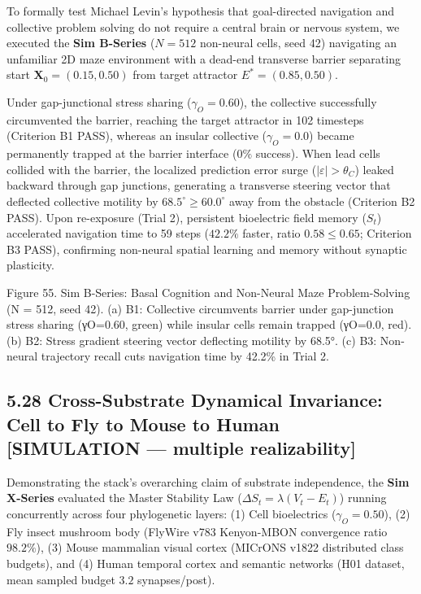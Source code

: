 \documentclass[
]{article}
\begin{document}
To formally test Michael Levin's hypothesis that goal-directed
navigation and collective problem solving do not require a central brain
or nervous system, we executed the \textbf{Sim B-Series} (\(N = 512\)
non-neural cells, seed 42) navigating an unfamiliar 2D maze environment
with a dead-end transverse barrier separating start
\(\mathbf{X}_0 = (0.15, 0.50)\) from target attractor
\(E^* = (0.85, 0.50)\).

Under gap-junctional stress sharing (\(\gamma_O = 0.60\)), the
collective successfully circumvented the barrier, reaching the target
attractor in 102 timesteps (Criterion B1 PASS), whereas an insular
collective (\(\gamma_O = 0.0\)) became permanently trapped at the
barrier interface (\(0\%\) success). When lead cells collided with the
barrier, the localized prediction error surge
(\(|\varepsilon| > \theta_C\)) leaked backward through gap junctions,
generating a transverse steering vector that deflected collective
motility by \(68.5^\circ \ge 60.0^\circ\) away from the obstacle
(Criterion B2 PASS). Upon re-exposure (Trial 2), persistent bioelectric
field memory (\(S_t\)) accelerated navigation time to 59 steps
(\(42.2\%\) faster, ratio \(0.58 \le 0.65\); Criterion B3 PASS),
confirming non-neural spatial learning and memory without synaptic
plasticity.

Figure 55. Sim B-Series: Basal Cognition and Non-Neural Maze
Problem-Solving ({N = 512}, seed 42). (a) B1: Collective circumvents
barrier under gap-junction stress sharing ({γO=0.60}, green) while
insular cells remain trapped ({γO=0.0}, red). (b) B2: Stress gradient
steering vector deflecting motility by {68.5°}. (c) B3: Non-neural
trajectory recall cuts navigation time by {42.2\%} in Trial 2.

\subsection{5.28 Cross-Substrate Dynamical Invariance: Cell to Fly to
Mouse to Human {[}SIMULATION --- multiple
realizability{]}}\label{cross-substrate-dynamical-invariance-cell-to-fly-to-mouse-to-human-simulation-multiple-realizability}

Demonstrating the stack's overarching claim of substrate independence,
the \textbf{Sim X-Series} evaluated the Master Stability Law
(\(\Delta S_t = \lambda(V_t - E_t)\)) running concurrently across four
phylogenetic layers: (1) Cell bioelectrics (\(\gamma_O = 0.50\)), (2)
Fly insect mushroom body (FlyWire v783 Kenyon-MBON convergence ratio
\(98.2\%\)), (3) Mouse mammalian visual cortex (MICrONS v1822
distributed class budgets), and (4) Human temporal cortex and semantic
networks (H01 dataset, mean sampled budget \(3.2\) synapses/post).
\end{document}
